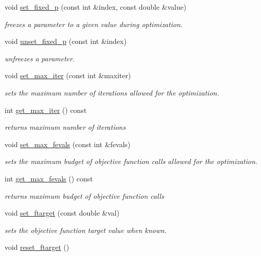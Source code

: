 \begin{DoxyCompactItemize}
void \hyperlink{classlibcmaes_1_1Parameters_a30236ca44b7de58b160bf2b1170f69b2}{set\+\_\+fixed\+\_\+p} (const int \&index, const double \&value)
\begin{DoxyCompactList}\small\item\em freezes a parameter to a given value during optimization. \end{DoxyCompactList}\item 
void \hyperlink{classlibcmaes_1_1Parameters_a540a57691845698e79af120f16d27f2c}{unset\+\_\+fixed\+\_\+p} (const int \&index)
\begin{DoxyCompactList}\small\item\em unfreezes a parameter. \end{DoxyCompactList}\item 
void \hyperlink{classlibcmaes_1_1Parameters_acefab965b50d45c6609e4f3267785ace}{set\+\_\+max\+\_\+iter} (const int \&maxiter)
\begin{DoxyCompactList}\small\item\em sets the maximum number of iterations allowed for the optimization. \end{DoxyCompactList}\item 
int \hyperlink{classlibcmaes_1_1Parameters_a95b8ff475b28b2cbf89cd147ab09eeee}{get\+\_\+max\+\_\+iter} () const 
\begin{DoxyCompactList}\small\item\em returns maximum number of iterations \end{DoxyCompactList}\item 
void \hyperlink{classlibcmaes_1_1Parameters_aa924cb4c8ffee0d148b63f5c0b55b4ce}{set\+\_\+max\+\_\+fevals} (const int \&fevals)
\begin{DoxyCompactList}\small\item\em sets the maximum budget of objective function calls allowed for the optimization. \end{DoxyCompactList}\item 
int \hyperlink{classlibcmaes_1_1Parameters_af738c73caee922feff43ba29218ea8ad}{get\+\_\+max\+\_\+fevals} () const 
\begin{DoxyCompactList}\small\item\em returns maximum budget of objective function calls \end{DoxyCompactList}\item 
void \hyperlink{classlibcmaes_1_1Parameters_a6ace7e5d230fcf82c70ba2dd3a801f97}{set\+\_\+ftarget} (const double \&val)
\begin{DoxyCompactList}\small\item\em sets the objective function target value when known. \end{DoxyCompactList}\item 
\hypertarget{classlibcmaes_1_1Parameters_aec14ab6c39a12e347080fa7e0f2e7c9f}{void \hyperlink{classlibcmaes_1_1Parameters_aec14ab6c39a12e347080fa7e0f2e7c9f}{reset\+\_\+ftarget} ()}\label{classlibcmaes_1_1Parameters_aec14ab6c39a12e347080fa7e0f2e7c9f}


\end{DoxyCompactItemize}
